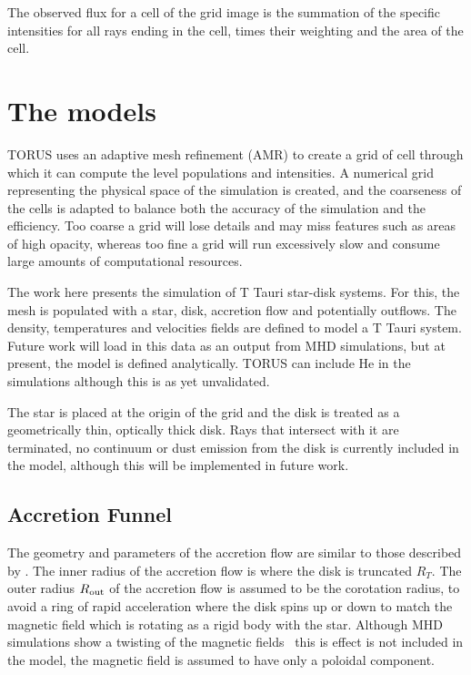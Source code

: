 \documentclass[fleqn,usenatbib]{mnras}
\begin{document}
The observed flux for a cell of the grid image is the summation of the specific intensities for all rays ending in the cell, times their weighting and the area of the cell.

\section{The models}
\label{sec:model}

TORUS uses an adaptive mesh refinement (AMR) to create a grid of cell through which it can compute the level populations and intensities.  A numerical grid representing the physical space of the simulation is created, and the coarseness of the cells is adapted to balance both the accuracy of the simulation and the efficiency. Too coarse a grid will lose details and may miss features such as areas of high opacity, whereas too fine a grid will run excessively slow and consume large amounts of computational resources.

The work here presents the simulation of T Tauri star-disk systems. For this, the mesh is populated with a star, disk, accretion flow and potentially outflows. The density, temperatures and velocities fields are defined to model a T Tauri system. Future work will load in this data as an output from MHD simulations, but at present, the model is defined analytically. TORUS can include He in the simulations although this is as yet unvalidated. 

The star is placed at the origin of the grid and the disk is treated as a geometrically thin, optically thick disk. Rays that intersect with it are terminated, no continuum or dust emission from the disk is currently included in the model, although this will be implemented in future work.

\subsection{Accretion Funnel}
\label{sec:accretion}
The geometry and parameters of the accretion flow are similar to those described by \citet{1998ApJ...495..385H}. The inner radius of the accretion flow is where the disk is truncated $R_{T}$. The outer radius $R_{\rm out}$ of the accretion flow is assumed to be the corotation radius, to avoid a ring of rapid acceleration where the disk spins up or down to match the magnetic field which is rotating as a rigid body with the star. Although MHD simulations show a twisting of the magnetic fields~\citep[e.g.][]{Uzdensky:2002dg} this is effect is not included in the model, the magnetic field is assumed to have only a poloidal component.
\end{document}

